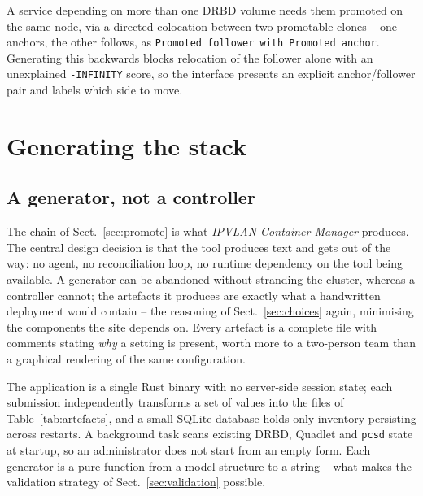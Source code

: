 \documentclass{webofc}
\begin{document}
A service depending on more than one DRBD volume needs them promoted on
the same node, via a directed colocation between two promotable clones --
one anchors, the other follows, as \texttt{Promoted follower with
Promoted anchor}. Generating this backwards blocks relocation of the
follower alone with an unexplained \texttt{-INFINITY} score, so the
interface presents an explicit anchor/follower pair and labels which
side to move.

\section{Generating the stack}
\label{sec:design}

\subsection{A generator, not a controller}

The chain of Sect.~\ref{sec:promote} is what \emph{IPVLAN Container
Manager} produces. The central design decision is that the tool produces
text and gets out of the way: no agent, no reconciliation loop, no
runtime dependency on the tool being available. A generator can be
abandoned without stranding the cluster, whereas a controller cannot;
the artefacts it produces are exactly what a handwritten deployment
would contain -- the reasoning of Sect.~\ref{sec:choices} again,
minimising the components the site depends on. Every artefact is a
complete file with comments stating \emph{why} a setting is present,
worth more to a two-person team than a graphical rendering of the same
configuration.

The application is a single Rust binary with no server-side session
state; each submission independently transforms a set of values into the
files of Table~\ref{tab:artefacts}, and a small SQLite database holds
only inventory persisting across restarts. A background task scans
existing DRBD, Quadlet and \texttt{pcsd} state at startup, so an
administrator does not start from an empty form. Each generator is a
pure function from a model structure to a string -- what makes the
validation strategy of Sect.~\ref{sec:validation} possible.
\end{document}
